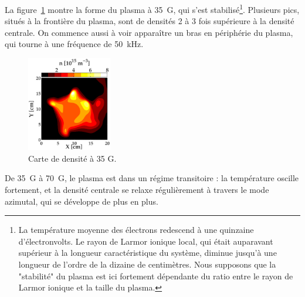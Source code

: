 \begin{refsection}
La figure~\ref{4-CybeleVarMag8} montre la forme du plasma à 35~G, qui s'est
stabilisé\footnote{La température moyenne des électrons redescend à une
quinzaine d'électronvolts. Le rayon de Larmor ionique local, qui était
auparavant supérieur à la longueur caractéristique du système, diminue
jusqu'à une longueur de l'ordre de la dizaine de centimètres. Nous supposons
que la "stabilité" du plasma est ici fortement dépendante du ratio entre le
rayon de Larmor ionique et la taille du plasma.}. Plusieurs pics, situés à la
frontière du plasma, sont de densités 2 à 3 fois supérieure à la densité
centrale. On commence aussi à voir apparaître un bras en périphérie du plasma,
qui tourne à une fréquence de 50~kHz.
\begin{figure}[!htb]
\centering
\includegraphics[width=0.33\textwidth]{figures/4-CybeleVarMag8.eps}
{\caption{Carte de densité à 35 G.}
\label{4-CybeleVarMag8}}
\end{figure}

De 35~G à 70~G, le plasma est dans un régime transitoire : la température
oscille fortement, et la densité centrale se relaxe régulièrement à travers 
le mode azimutal, qui se développe de plus en plus.


\end{refsection}
